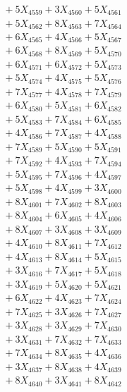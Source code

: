 \documentclass[a4paper,10pt]{article}
\begin{document}
{\begin{align}
&\;  + 5 X_{4559} + 3 X_{4560} + 5 X_{4561} \\[0.3ex]
&\;  + 5 X_{4562} + 8 X_{4563} + 7 X_{4564} \\[0.3ex]
&\;  + 6 X_{4565} + 4 X_{4566} + 5 X_{4567} \\[0.3ex]
&\;  + 6 X_{4568} + 8 X_{4569} + 5 X_{4570} \\[0.5ex]\allowbreak
&\;  + 6 X_{4571} + 6 X_{4572} + 5 X_{4573} \\[0.3ex]
&\;  + 5 X_{4574} + 4 X_{4575} + 5 X_{4576} \\[0.3ex]
&\;  + 7 X_{4577} + 4 X_{4578} + 7 X_{4579} \\[0.3ex]
&\;  + 6 X_{4580} + 5 X_{4581} + 6 X_{4582} \\[0.3ex]
&\;  + 5 X_{4583} + 7 X_{4584} + 6 X_{4585} \\[0.3ex]
&\;  + 4 X_{4586} + 7 X_{4587} + 4 X_{4588} \\[0.3ex]
&\;  + 7 X_{4589} + 5 X_{4590} + 5 X_{4591} \\[0.3ex]
&\;  + 7 X_{4592} + 4 X_{4593} + 7 X_{4594} \\[0.3ex]
&\;  + 5 X_{4595} + 7 X_{4596} + 4 X_{4597} \\[0.3ex]
&\;  + 5 X_{4598} + 4 X_{4599} + 3 X_{4600} \\[0.5ex]\allowbreak
&\;  + 8 X_{4601} + 7 X_{4602} + 8 X_{4603} \\[0.3ex]
&\;  + 8 X_{4604} + 6 X_{4605} + 4 X_{4606} \\[0.3ex]
&\;  + 8 X_{4607} + 3 X_{4608} + 3 X_{4609} \\[0.3ex]
&\;  + 4 X_{4610} + 8 X_{4611} + 7 X_{4612} \\[0.3ex]
&\;  + 4 X_{4613} + 8 X_{4614} + 5 X_{4615} \\[0.3ex]
&\;  + 3 X_{4616} + 7 X_{4617} + 5 X_{4618} \\[0.3ex]
&\;  + 3 X_{4619} + 5 X_{4620} + 5 X_{4621} \\[0.3ex]
&\;  + 6 X_{4622} + 4 X_{4623} + 7 X_{4624} \\[0.3ex]
&\;  + 7 X_{4625} + 3 X_{4626} + 7 X_{4627} \\[0.3ex]
&\;  + 3 X_{4628} + 3 X_{4629} + 7 X_{4630} \\[0.5ex]\allowbreak
&\;  + 3 X_{4631} + 7 X_{4632} + 7 X_{4633} \\[0.3ex]
&\;  + 7 X_{4634} + 8 X_{4635} + 4 X_{4636} \\[0.3ex]
&\;  + 3 X_{4637} + 8 X_{4638} + 4 X_{4639} \\[0.3ex]
&\;  + 8 X_{4640} + 3 X_{4641} + 8 X_{4642} \\[0.3ex]

\end{align}}
\end{document}
